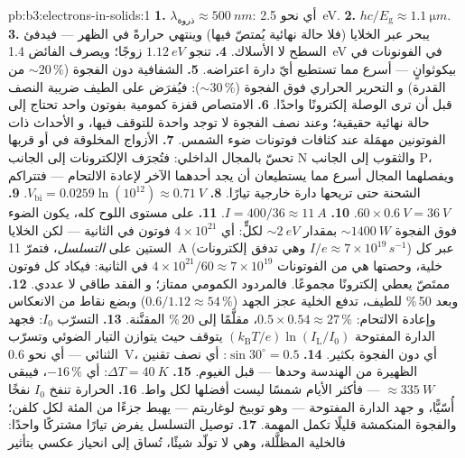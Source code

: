 \begin{solution}{pb:b3:electrons-in-solids:1}
\textbf{1.} $\lambda_{\text{ذروة}} \approx \qty{500}{nm}$:
أي نحو \qty{2.5}{eV}.
\textbf{2.} $hc/E_{\text{g}} \approx \qty{1.1}{\micro m}$.
\textbf{3.} يبحر عبر الخلايا (فلا حالة نهائية يُمتصّ
فيها) وينتهي حرارةً في الظهر --- فيدفئ السطح لا
الأسلاك.
\textbf{4.} تنجو $\qty{1.12}{eV}$ زوجًا؛ ويصرف الفائض
\qty{1.4}{eV} في الفونونات في بيكوثوانٍ --- أسرع
مما تستطيع أيّ دارة اعتراضه.
\textbf{5.} الشفافية دون الفجوة ($\sim20\,\%$ من القدرة) و
التحرير الحراري فوق الفجوة ($\sim30\,\%$): فيُفرَض على الطيف ضريبة
النصف قبل أن ترى الوصلة إلكترونًا واحدًا.
\textbf{6.} الامتصاص قفزة كمومية بفوتون واحد تحتاج إلى
حالة نهائية حقيقية؛ وعند نصف الفجوة لا توجد واحدة للتوقف فيها، و
الأحداث ذات الفوتونين مهمَلة عند كثافات فوتونات ضوء الشمس.
\textbf{7.} الأزواج المخلوقة في  أو قربها تحسّ
بالمجال الداخلي: فتُجرَف الإلكترونات إلى الجانب N والثقوب إلى
الجانب P، ويفصلهما المجال أسرع مما يستطيعان أن يجد
أحدهما الآخر لإعادة الالتحام --- فتتراكم الشحنة حتى تريحها دارة
خارجية تيارًا.
\textbf{8.} $V_{\text{bi}} = 0.0259\ln(10^{12}) \approx
\qty{0.71}{V}$.
\textbf{9.} $60\times\qty{0.6}{V} = \qty{36}{V}$.
\textbf{10.} $I = 400/36 \approx \qty{11}{A}$.
\textbf{11.} على مستوى اللوح كله، يكون الضوء فوق الفجوة
$\sim\qty{1400}{W}$ بمقدار $\sim\qty{2}{eV}$ لكلٍّ: أي $4\times10^{21}$
فوتون في الثانية --- لكن الخلايا الستين على \emph{التسلسل}،
فتمرّ \qty{11}{A} (وهي تدفق إلكترونات $I/e \approx
7\times10^{19}\,\unit{s^{-1}}$) عبر كل خلية، وحصتها
هي من الفوتونات $4\times10^{21}/60 \approx
7\times10^{19}$ في الثانية: فيكاد كل فوتون ممتَصّ يعطي
إلكترونًا مجموعًا. فالمردود الكمومي ممتاز؛ و
الفقد طاقي لا عددي.
\textbf{12.} وبعد 50\,\% للطيف، تدفع الخلية
عجز الجهد ($0.6/1.12 \approx 54\,\%$) وبضع نقاط من
الانعكاس وإعادة الالتحام: $0.5\times0.54 \approx 27\,\%$،
مقلَّمًا إلى 20\,\% المقنَّنة.
\textbf{13.} التسرّب $I_0$: فجهد الدارة المفتوحة
$(k_{\text{B}}T/e)\ln(I_{\text{L}}/I_0)$ يتوقف حيث
يتوازن التيار الضوئي وتسرّب الثنائي --- أي نحو \qty{0.6}{V}، أي دون
الفجوة بكثير.
\textbf{14.} $\sin30^\circ = 0.5$: أي نصف تقنين الظهيرة من
الهندسة وحدها --- قبل الغيوم.
\textbf{15.} $\Delta T = \qty{40}{K}$: أي $-16\,\%$، فيبقى
$\approx\qty{335}{W}$ --- فأكثر الأيام شمسًا ليست أفضلها
لكل واط.
\textbf{16.} الحرارة تنفخ $I_0$ نفخًا أُسّيًّا، و
جهد الدارة المفتوحة --- وهو توبيخ لوغاريتم --- يهبط
جزءًا من المئة لكل كلفن؛ والفجوة المنكمشة قليلًا
تكمل المهمة.
\textbf{17.} توصيل التسلسل يفرض تيارًا مشتركًا واحدًا: فالخلية
المظلَّلة، وهي لا تولّد شيئًا، تُساق إلى انحياز عكسي بتأثير

\end{solution}
